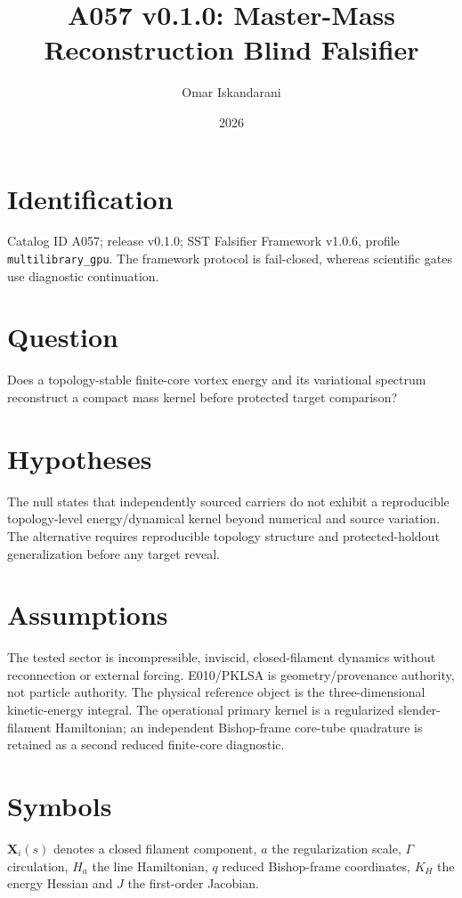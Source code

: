 \documentclass[11pt]{article}
\title{A057 v0.1.0: Master-Mass Reconstruction Blind Falsifier}
\author{Omar Iskandarani}
\date{2026}
\begin{document}
\maketitle

\section{Identification}
Catalog ID A057; release v0.1.0; SST Falsifier Framework v1.0.6, profile \texttt{multilibrary\_gpu}. The framework protocol is fail-closed, whereas scientific gates use diagnostic continuation.

\section{Question}
Does a topology-stable finite-core vortex energy and its variational spectrum reconstruct a compact mass kernel before protected target comparison?

\section{Hypotheses}
The null states that independently sourced carriers do not exhibit a reproducible topology-level energy/dynamical kernel beyond numerical and source variation. The alternative requires reproducible topology structure and protected-holdout generalization before any target reveal.

\section{Assumptions}
The tested sector is incompressible, inviscid, closed-filament dynamics without reconnection or external forcing. E010/PKLSA is geometry/provenance authority, not particle authority. The physical reference object is the three-dimensional kinetic-energy integral. The operational primary kernel is a regularized slender-filament Hamiltonian; an independent Bishop-frame core-tube quadrature is retained as a second reduced finite-core diagnostic.

\section{Symbols}
\(\mathbf X_i(s)\) denotes a closed filament component, \(a\) the regularization scale, \(\Gamma\) circulation, \(H_a\) the line Hamiltonian, \(q\) reduced Bishop-frame coordinates, \(K_H\) the energy Hessian and \(J\) the first-order Jacobian.
\end{document}
